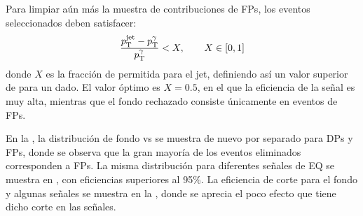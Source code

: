 Para limpiar aún más la muestra de contribuciones de \acp{FP}, los eventos seleccionados deben satisfacer:
\begin{equation}
    \label{eq:evt_selection:sr_opt:jet_pt:jet_pt_rel_X}
    \frac{p_{\text{T}}^\text{jet} - p_{\text{T}}^{\gamma}}{p_{\text{T}}^{\gamma}} < X, \qquad X \in [0, 1]
\end{equation}
donde \(X\) es la fracción de \ptgam permitida para el jet, definiendo así un valor superior de \ptjet para un \ptgam dado. El valor óptimo es \(X=0.5\), en el que la eficiencia de la señal es muy alta, mientras que el fondo rechazado consiste únicamente en eventos de \acp{FP}.

En la \Fig{\ref{fig:evt_selection:sr_opt:jet_pt:ptgam_ptjet_X0.5}}, la distribución de fondo \ptgam vs \ptjet se muestra de nuevo por separado para \acp{DP} y \acp{FP}, donde se observa que la gran mayoría de los eventos eliminados corresponden a \acp{FP}. La misma distribución para diferentes señales de \ac{EQ} se muestra en \Fig{\ref{fig:evt_selection:sr_opt:jet_pt:ptgam_ptjet_signals}}, con eficiencias superiores al 95\%. La eficiencia de corte para el fondo y algunas señales \qstar se muestra en la \Tab{\ref{tab:evt_selection:sr_opt:jet_pt:efficiency_selection}}, donde se aprecia el poco efecto que tiene dicho corte en las señales.


